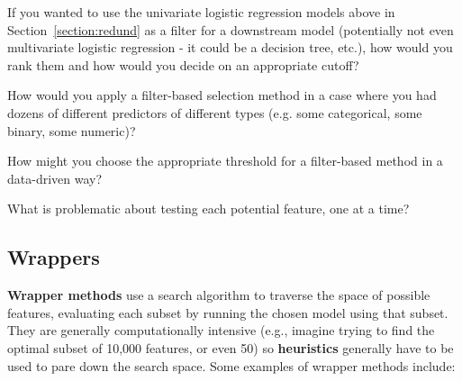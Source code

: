 \begin{question}{}
If you wanted to use the univariate logistic regression models above in Section~\ref{section:redund} as a filter for a downstream model (potentially not even multivariate logistic regression - it could be a decision tree, etc.), how would you rank them and how would you decide on an appropriate cutoff? 
\end{question}

\begin{question}{}
How would you apply a filter-based selection method in a case where you had dozens of different predictors of different types (e.g. some categorical, some binary, some numeric)? 
\end{question}

\begin{question}{}
How might you choose the appropriate threshold for a filter-based method in a data-driven way? 
\end{question}

\begin{question}{}
What is problematic about testing each potential feature, one at a time?
\end{question}

\subsection{Wrappers}

\textbf{Wrapper methods} use a search algorithm to traverse the space of possible features, evaluating each subset by running the chosen model using that subset. They are generally computationally intensive (e.g., imagine trying to find the optimal subset of 10,000 features, or even 50) so \textbf{heuristics} generally have to be used to pare down the search space. Some examples of wrapper methods include:


